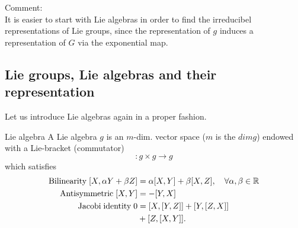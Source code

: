 Comment:\\
It is easier to start with Lie algebras in order to find the irreducibel representations of Lie groups, since the representation of $g$ induces a representation of $G$ via the exponential map.
\subsection{Lie groups, Lie algebras and their representation}
Let us introduce Lie algebras again in a proper fashion.
\begin{mybox}{Lie algebra}
	A Lie algebra $g$ is an $m$-dim. vector space ($m$ is the $dimg$) endowed with a Lie-bracket (commutator) 
	\begin{equation*}
		[\; , \; ]: g\times g \rightarrow g
	\end{equation*}
which satisfies
\begin{align}
	\mathrm{Bilinearity\;} [X,\alpha Y+ \beta Z] &= \alpha [X,Y] + \beta [X,Z], \quad \forall \alpha,\beta \in \mathbb{R} \\
	\mathrm{Antisymmetric\;} [X,Y] &=-[Y,X] \\
	\mathrm{Jacobi\;identity\;} 0&=[X,[Y,Z]] + [Y,[Z,X]] \\
	&+ [Z,[X,Y]]\nonumber.
\end{align}
\end{mybox}
